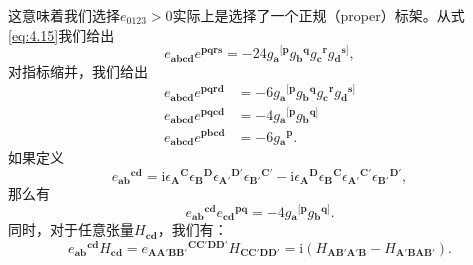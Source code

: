 这意味着我们选择$e_{0123}  >0$实际上是选择了一个正规（proper）标架。从式\ref{eq:4.15}我们给出
\begin{equation*}
	e_{\boldsymbol{abcd}} e^{\boldsymbol{pqrs}} =-24g{_{\boldsymbol{a}}}^{[\boldsymbol{p}} g{_{\boldsymbol{b}}}^{\boldsymbol{q}} g{_{\boldsymbol{c}}}^{\boldsymbol{r}} g{_{\boldsymbol{d}}}^{\boldsymbol{s}]} ,
\end{equation*}
对指标缩并，我们给出
\begin{equation*}
	\begin{aligned}
		e_{\boldsymbol{abcd}} e^{\boldsymbol{pqrd}} & =-6g{_{\boldsymbol{a}}}^{[\boldsymbol{p}} g{_{\boldsymbol{b}}}^{\boldsymbol{q}} g{_{\boldsymbol{c}}}^{\boldsymbol{r}} g{_{\boldsymbol{d}}}^{\boldsymbol{s}]}\\
		e_{\boldsymbol{abcd}} e^{\boldsymbol{pqcd}} & =-4g{_{\boldsymbol{a}}}^{[\boldsymbol{p}} g{_{\boldsymbol{b}}}^{\boldsymbol{q}]}\\
		e_{\boldsymbol{abcd}} e^{\boldsymbol{pbcd}} & =-6g{_{\boldsymbol{a}}}^{\boldsymbol{p}} .
	\end{aligned}
\end{equation*}
如果定义
\begin{equation*}
	e{_{\boldsymbol{ab}}}^{\boldsymbol{cd}} =\mathrm{i} \epsilon {_{\boldsymbol{A}}}^{\boldsymbol{C}} \epsilon {_{\boldsymbol{B}}}^{\boldsymbol{D}} \epsilon {_{\boldsymbol{A} '}}^{\boldsymbol{D} '} \epsilon {_{\boldsymbol{B} '}}^{\boldsymbol{C} '} -\mathrm{i} \epsilon {_{\boldsymbol{A}}}^{\boldsymbol{D}} \epsilon {_{\boldsymbol{B}}}^{\boldsymbol{C}} \epsilon {_{\boldsymbol{A} '}}^{\boldsymbol{C} '} \epsilon {_{\boldsymbol{B} '}}^{\boldsymbol{D} '} ,
\end{equation*}
那么有
\begin{equation*}
	e{_{\boldsymbol{ab}}}^{\boldsymbol{cd}} e{_{\boldsymbol{cd}}}^{\boldsymbol{pq}} =-4g{_{\boldsymbol{a}}}^{[\boldsymbol{p}} g{_{\boldsymbol{b}}}^{\boldsymbol{q}]} .
\end{equation*}
同时，对于任意张量$H_{\boldsymbol{cd}}$，我们有：
\begin{equation*}
	e{_{\boldsymbol{ab}}}^{\boldsymbol{cd}} H_{\boldsymbol{cd}} =e{_{\boldsymbol{AA} '\boldsymbol{BB} '}}^{\boldsymbol{CC} '\boldsymbol{DD} '} H_{\boldsymbol{CC} '\boldsymbol{DD} '} =\mathrm{i}( H_{\boldsymbol{AB} '\boldsymbol{A} '\boldsymbol{B}} -H_{\boldsymbol{A} '\boldsymbol{BAB} '}) .
\end{equation*}


